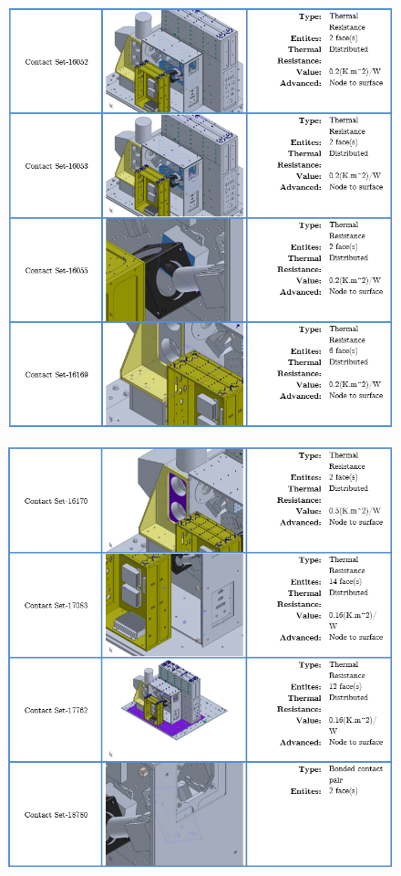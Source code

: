 \begin{figure}
    \centering
    \includegraphics[width=\textwidth]{thermal_load_images/sunrise_TL_images/sunrise_13.PNG}
\end{figure}

\begin{figure}
    \centering
    \includegraphics[width=\textwidth]{thermal_load_images/sunrise_TL_images/sunrise_14.PNG}
\end{figure}

